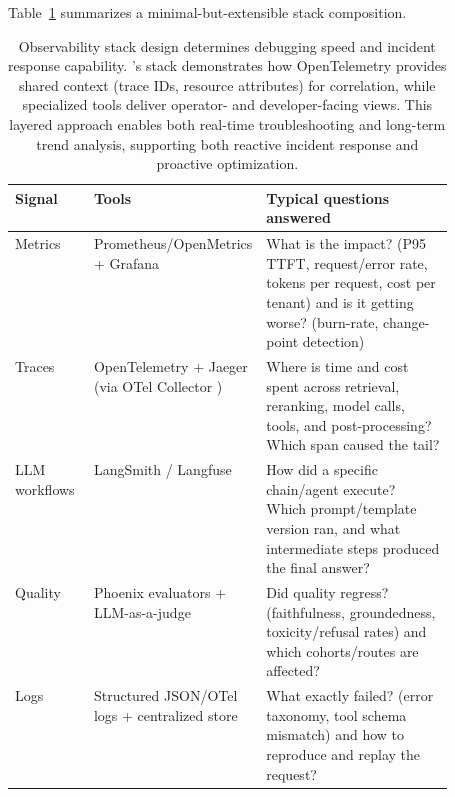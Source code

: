 Table~\ref{tab:ch05_ishtar_obs_stack} summarizes a minimal-but-extensible stack composition.

\begin{table}[t]
\centering
\small
\caption{Observability stack design determines debugging speed and incident response capability. \ishtar{}'s stack demonstrates how OpenTelemetry provides shared context (trace IDs, resource attributes) for correlation, while specialized tools deliver operator- and developer-facing views. This layered approach enables both real-time troubleshooting and long-term trend analysis, supporting both reactive incident response and proactive optimization.}
\label{tab:ch05_ishtar_obs_stack}
\setlength{\tabcolsep}{6pt}
\renewcommand{\arraystretch}{1.3}
\begin{tabularx}{0.95\linewidth}{@{}>{\raggedright\arraybackslash}p{0.18\linewidth}>{\raggedright\arraybackslash}p{0.33\linewidth}>{\raggedright\arraybackslash}X@{}}
\toprule
\rowcolor{gray!15}
\textbf{Signal} & \textbf{Tools} & \textbf{Typical questions answered} \\
\midrule
Metrics & Prometheus/OpenMetrics \cite{prometheus_instrumentation,openmetrics_spec} + Grafana \cite{grafana_dashboards} & What is the impact? (P95 TTFT, request/error rate, tokens per request, cost per tenant) and is it getting worse? (burn-rate, change-point detection) \\
Traces & OpenTelemetry \cite{otel_spec} + Jaeger \cite{jaeger_tracing} (via OTel Collector \cite{otel_collector}) & Where is time and cost spent across retrieval, reranking, model calls, tools, and post-processing? Which span caused the tail? \\
LLM workflows & LangSmith \cite{langsmith_home} / Langfuse \cite{langfuse_obs_overview} & How did a specific chain/agent execute? Which prompt/template version ran, and what intermediate steps produced the final answer? \\
Quality & Phoenix evaluators \cite{arize_phoenix_docs} + LLM-as-a-judge \cite{zheng2023judge} & Did quality regress? (faithfulness, groundedness, toxicity/refusal rates) and which cohorts/routes are affected? \\
Logs & Structured JSON/OTel logs \cite{otel_logs_concepts} + centralized store & What exactly failed? (error taxonomy, tool schema mismatch) and how to reproduce and replay the request? \\
\bottomrule
\end{tabularx}
\end{table}

